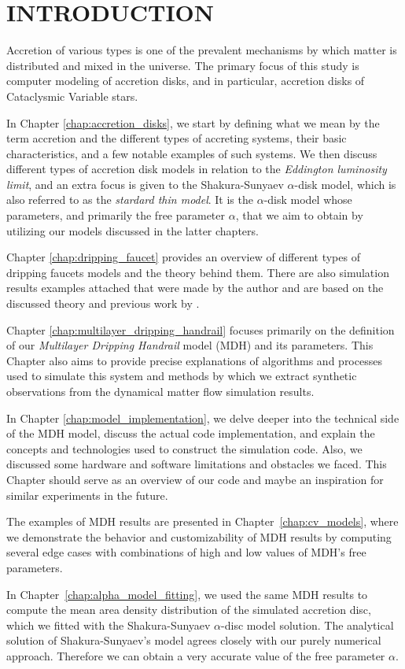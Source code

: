 \chapter{INTRODUCTION}
\thispagestyle{empty}


Accretion of various types is one of the prevalent mechanisms by which matter is distributed and mixed in the universe. The primary focus of this study is computer modeling of accretion disks, and in particular, accretion disks of Cataclysmic Variable stars.

In Chapter \ref{chap:accretion_disks}, we start by defining what we mean by the term accretion and the different types of accreting systems, their basic characteristics, and a few notable examples of such systems. We then discuss different types of accretion disk models in relation to the \emph{Eddington luminosity limit}, and an extra focus is given to the Shakura-Sunyaev $\alpha$-disk model, which is also referred to as the \emph{stardard thin model}. It is the $\alpha$-disk model whose parameters, and primarily the free parameter $\alpha$, that we aim to obtain by utilizing our models discussed in the latter chapters.

Chapter \ref{chap:dripping_faucet} provides an overview of different types of dripping faucets models and the theory behind them. There are also simulation results examples attached that were made by the author and are based on the discussed theory and previous work by \citep{kveton2014}.

Chapter \ref{chap:multilayer_dripping_handrail} focuses primarily on the definition of our \emph{Multilayer Dripping Handrail} model (MDH) and its parameters. This Chapter also aims to provide precise explanations of algorithms and processes used to simulate this system and methods by which we extract synthetic observations from the dynamical matter flow simulation results.

In Chapter \ref{chap:model_implementation}, we delve deeper into the technical side of the MDH model, discuss the actual code implementation, and explain the concepts and technologies used to construct the simulation code. Also, we discussed some hardware and software limitations and obstacles we faced. This Chapter should serve as an overview of our code and maybe an inspiration for similar experiments in the future.

The examples of MDH results are presented in Chapter~\ref{chap:cv_models}, where we demonstrate the behavior and customizability of MDH results by computing several edge cases with combinations of high and low values of MDH's free parameters. 

In Chapter~\ref{chap:alpha_model_fitting}, we used the same MDH results to compute the mean area density distribution of the simulated accretion disc, which we fitted with the Shakura-Sunyaev $\alpha$-disc model solution. The analytical solution of Shakura-Sunyaev's model agrees closely with our purely numerical approach. Therefore we can obtain a very accurate value of the free parameter $\alpha$.
